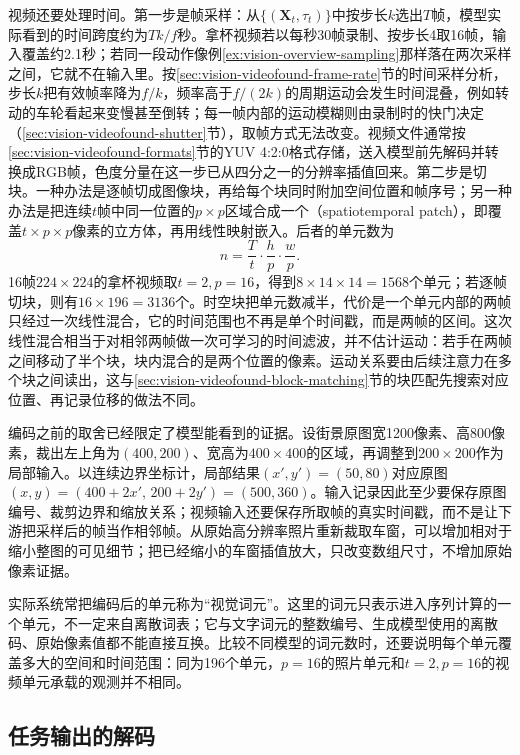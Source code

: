 视频还要处理时间。第一步是帧采样：从$\{(\bm X_t,\tau_t)\}$中按步长$k$选出$T$帧，模型实际看到的时间跨度约为$Tk/f$秒。拿杯视频若以每秒30帧录制、按步长4取16帧，输入覆盖约2.1秒；若同一段动作像例\ref{ex:vision-overview-sampling}那样落在两次采样之间，它就不在输入里。按\ref{sec:vision-videofound-frame-rate}节的时间采样分析，步长$k$把有效帧率降为$f/k$，频率高于$f/(2k)$的周期运动会发生时间混叠，例如转动的车轮看起来变慢甚至倒转；每一帧内部的运动模糊则由录制时的快门决定（\ref{sec:vision-videofound-shutter}节），取帧方式无法改变。视频文件通常按\ref{sec:vision-videofound-formats}节的YUV 4:2:0格式存储，送入模型前先解码并转换成RGB帧，色度分量在这一步已从四分之一的分辨率插值回来。第二步是切块。一种办法是逐帧切成图像块，再给每个块同时附加空间位置和帧序号；另一种办法是把连续$t$帧中同一位置的$p\times p$区域合成一个（spatiotemporal patch），即覆盖$t\times p\times p$像素的立方体，再用线性映射嵌入。后者的单元数为
\begin{equation}
  n=\frac{T}{t}\cdot\frac{h}{p}\cdot\frac{w}{p}.
  \label{eq:vision-ivm-tube-count}
\end{equation}
16帧$224\times224$的拿杯视频取$t=2,p=16$，得到$8\times14\times14=1568$个单元；若逐帧切块，则有$16\times196=3136$个。时空块把单元数减半，代价是一个单元内部的两帧只经过一次线性混合，它的时间范围也不再是单个时间戳，而是两帧的区间。这次线性混合相当于对相邻两帧做一次可学习的时间滤波，并不估计运动：若手在两帧之间移动了半个块，块内混合的是两个位置的像素。运动关系要由后续注意力在多个块之间读出，这与\ref{sec:vision-videofound-block-matching}节的块匹配先搜索对应位置、再记录位移的做法不同。

编码之前的取舍已经限定了模型能看到的证据。设街景原图宽1200像素、高800像素，裁出左上角为$(400,200)$、宽高为$400\times400$的区域，再调整到$200\times200$作为局部输入。以连续边界坐标计，局部结果$(x',y')=(50,80)$对应原图$(x,y)=(400+2x',\,200+2y')=(500,360)$。输入记录因此至少要保存原图编号、裁剪边界和缩放关系；视频输入还要保存所取帧的真实时间戳，而不是让下游把采样后的帧当作相邻帧。从原始高分辨率照片重新裁取车窗，可以增加相对于缩小整图的可见细节；把已经缩小的车窗插值放大，只改变数组尺寸，不增加原始像素证据。

实际系统常把编码后的单元称为“视觉词元”。这里的词元只表示进入序列计算的一个单元，不一定来自离散词表；它与文字词元的整数编号、生成模型使用的离散码、原始像素值都不能直接互换。比较不同模型的词元数时，还要说明每个单元覆盖多大的空间和时间范围：同为196个单元，$p=16$的照片单元和$t=2,p=16$的视频单元承载的观测并不相同。

\subsection{任务输出的解码}
\label{sec:vision-ivm-decoding}

